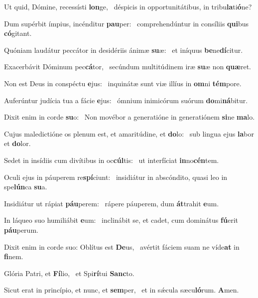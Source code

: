 \item Ut quid, Dómine, recessísti \textbf{lon}ge,~\psstar{} déspicis in opportunitátibus, in tribu\textbf{la}ti\textbf{ó}ne?
\item Dum supérbit ímpius, incénditur \textbf{pau}per:~\psstar{} comprehendúntur in consíliis \textbf{qui}bus \textbf{có}gitant.
\item Quóniam laudátur peccátor in desidériis ánimæ \textbf{su}æ:~\psstar{} et iníquus \textbf{be}ne\textbf{dí}citur.
\item Exacerbávit Dóminum pec\textbf{cá}tor,~\psstar{} secúndum multitúdinem iræ \textbf{su}æ non \textbf{quæ}ret.
\item Non est Deus in conspéctu \textbf{e}jus:~\psstar{} inquinátæ sunt viæ illíus in \textbf{om}ni \textbf{tém}pore.
\item Auferúntur judícia tua a fácie \textbf{e}jus:~\psstar{} ómnium inimicórum suórum \textbf{do}mi\textbf{ná}bitur.
\item Dixit enim in corde \textbf{su}o:~\psstar{} Non movébor a generatióne in generatiónem \textbf{si}ne \textbf{ma}lo.
\item Cujus maledictióne os plenum est, et amaritúdine, et \textbf{do}lo:~\psstar{} sub lingua ejus \textbf{la}bor et \textbf{do}lor.
\item Sedet in insídiis cum divítibus in oc\textbf{cúl}tis:~\psstar{} ut interfíciat \textbf{in}no\textbf{cén}tem.
\item Oculi ejus in páuperem re\textbf{spí}ciunt:~\psstar{} insidiátur in abscóndito, quasi leo in spe\textbf{lún}ca \textbf{su}a.
\item Insidiátur ut rápiat \textbf{páu}pe\-rem:~\psstar{} rápere páuperem, dum \textbf{át}trahit \textbf{e}um.
\item In láqueo suo humiliábit \textbf{e}um:~\psstar{} inclinábit se, et cadet, cum dominátus \textbf{fú}erit \textbf{páu}perum.
\item Dixit enim in corde suo: Oblítus est \textbf{De}us,~\psstar{} avértit fáciem suam ne víde\textbf{at} in \textbf{fi}nem.
\item Glória Patri, et \textbf{Fí}lio,~\psstar{} et Spi\textbf{rí}tui \textbf{Sanc}to.
\item Sicut erat in princípio, et nunc, et \textbf{sem}per,~\psstar{} et in sǽcula sæcu\textbf{ló}rum. \textbf{A}men.
